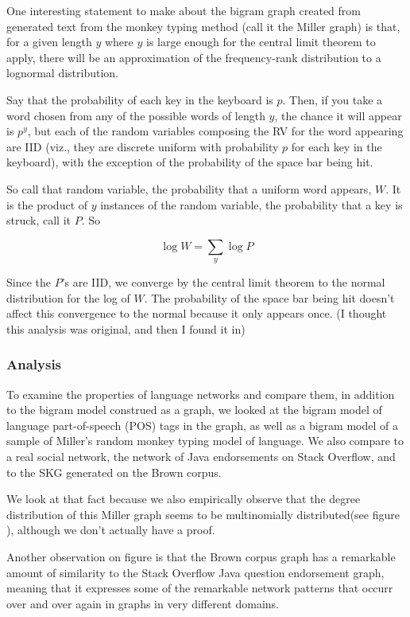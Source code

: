\documentclass[12pt]{article}
\begin{document}
One interesting statement to make about the bigram graph created from generated text from the monkey typing method (call it the Miller graph) is that, for a given length $y$ where $y$ is large enough for the central limit theorem to apply, there will be an approximation of the frequency-rank distribution to a lognormal distribution.

Say that the probability of each key in the keyboard is $p$. Then, if you take a word chosen from any of the possible words of length $y$, the chance it will appear is $p^y$, but each of the random variables composing the RV for the word appearing are IID (viz., they are discrete uniform with probability $p$ for each key in the keyboard), with the exception of the probability of the space bar being hit.

So call that random variable, the probability that a uniform word appears, $W$. It is the product of $y$ instances of the random variable, the probability that a key is struck, call it $P$. So

$$ \log W = \sum_y \log P $$

Since the $P$'s are IID, we converge by the central limit theorem to the normal distribution for the log of $W$. The probability of the space bar being hit doesn't affect this convergence to the normal because it only appears once. (I thought this analysis was original, and then I found it in) %

\subsubsection*{Analysis}

To examine the properties of language networks and compare them, in addition to the bigram model construed as a graph, we looked at the bigram model of language part-of-speech (POS) tags in the graph, as well as a bigram model of a sample of Miller's random monkey typing model of language. We also compare to a real social network, the network of Java endorsements on Stack Overflow, and to the SKG generated on the Brown corpus.%

We look at that fact because we also empirically observe that the degree distribution of this Miller graph seems to be multinomially distributed(see figure \label{fig:plots}), although we don't actually have a proof.

Another observation on figure \label{fig:plots} is that the Brown corpus graph has a remarkable amount of similarity to the Stack Overflow Java question endorsement graph, meaning that it expresses some of the remarkable network patterns that occurr over and over again in graphs in very different domains. %
\end{document}
